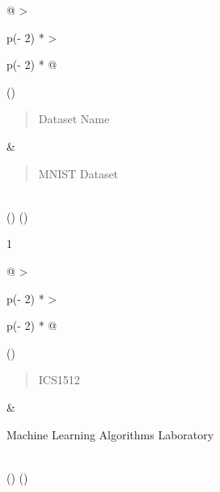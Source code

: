 \documentclass[
]{article}
\begin{document}
\begin{longtable}[]{@{}
  >{\raggedright\arraybackslash}p{(\columnwidth - 2\tabcolsep) * }
  >{\raggedright\arraybackslash}p{(\columnwidth - 2\tabcolsep) * }@{}}
\toprule()
\begin{minipage}[b]{\linewidth}\raggedright
\begin{quote}
Dataset Name
\end{quote}
\end{minipage} & \begin{minipage}[b]{\linewidth}\raggedright
\begin{quote}
MNIST Dataset
\end{quote}
\end{minipage} \\
\midrule()
\endhead
\bottomrule()
\end{longtable}

1

\begin{longtable}[]{@{}
  >{\raggedright\arraybackslash}p{(\columnwidth - 2\tabcolsep) * }
  >{\raggedright\arraybackslash}p{(\columnwidth - 2\tabcolsep) * }@{}}
\toprule()
\begin{minipage}[b]{\linewidth}\raggedright
\begin{quote}
ICS1512
\end{quote}
\end{minipage} & \begin{minipage}[b]{\linewidth}\raggedright
Machine Learning Algorithms Laboratory
\end{minipage} \\
\midrule()
\endhead
\bottomrule()
\end{longtable}
\end{document}
